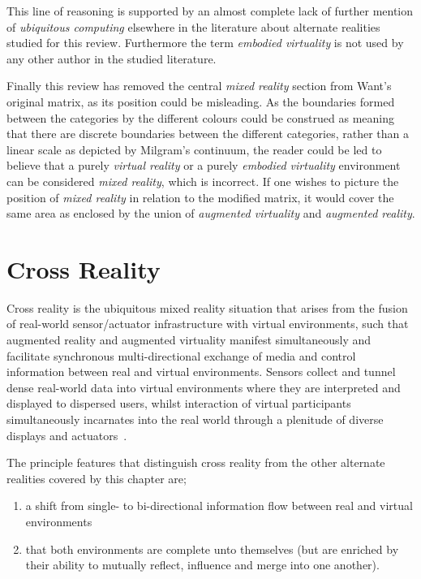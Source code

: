 This line of reasoning is supported by an almost complete lack of further mention of \textit{ubiquitous computing} elsewhere in the literature about alternate realities studied for this review. Furthermore the term \textit{embodied virtuality} is not used by any other author in the studied literature.

Finally this review has removed the central \textit{mixed reality} section from Want's original matrix, as its position could be misleading. As the boundaries formed between the categories by the different colours could be construed as meaning that there are discrete boundaries between the different categories, rather than a linear scale as depicted by Milgram's continuum, the reader could be led to believe that a purely \textit{virtual reality} or a purely \textit{embodied virtuality} environment can be considered \textit{mixed reality}, which is incorrect. If one wishes to picture the position of \textit{mixed reality} in relation to the modified matrix, it would cover the same area as enclosed by the union of \textit{augmented virtuality} and \textit{augmented reality}.


\section{Cross Reality}

Cross reality is the ubiquitous mixed reality situation that arises from the fusion of real-world sensor/actuator infrastructure with virtual environments, such that augmented reality and augmented virtuality manifest simultaneously and facilitate synchronous multi-directional exchange of media and control information between real and virtual environments. Sensors collect and tunnel dense real-world data into virtual environments where they are interpreted and displayed to dispersed users, whilst interaction of virtual participants simultaneously incarnates into the real world through a plenitude of diverse displays and actuators~\cite{Paradiso2009}.

The principle features that distinguish cross reality from the other alternate realities covered by this chapter are;
\begin{enumerate}
	\item a shift from single- to bi-directional information flow between real and virtual environments~\cite{kim:practical}
	\item that both environments are complete unto themselves (but are enriched by their ability to mutually reflect, influence and merge into one another).~\cite{lifton:merging}
\end{enumerate}

